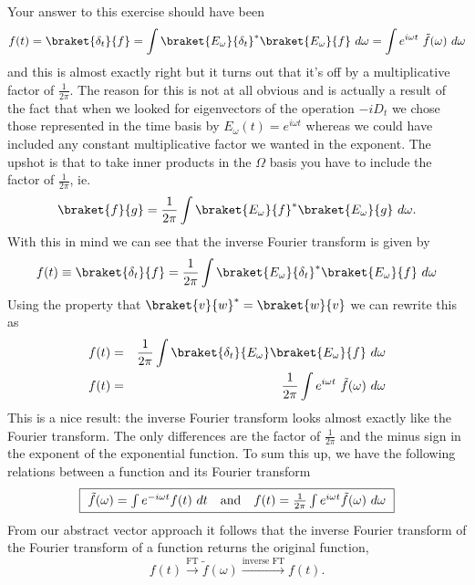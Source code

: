 Your answer to this exercise should have been
\begin{displaymath} f(t) = \braket{\delta_t}{f} = \int \braket{E_\omega}{\delta_t}^*\braket{E_\omega}{f}~d\omega = \int e^{i\omega t}~\tilde{f}(\omega )~d\omega \end{displaymath}
and this is almost exactly right but it turns out that it's off by a multiplicative factor of $\frac{1}{2\pi}$.  The reason for this is not at all obvious and is actually a result of the fact that when we looked for eigenvectors of the operation $-iD_t$ we chose those represented in the time basis by $E_\omega (t) = e^{i\omega t}$ whereas we could have included any constant multiplicative factor we wanted in the exponent.  The upshot is that to take inner products in the $\Omega$ basis you have to include the factor of $\frac{1}{2\pi}$, ie.
\begin{displaymath} \braket{f}{g} = \frac{1}{2\pi}\int \braket{E_\omega}{f}^*\braket{E_\omega}{g}~d\omega. \end{displaymath}
With this in mind we can see that the inverse Fourier transform is given by
\begin{displaymath}
f(t) \equiv \braket{\delta_t}{f} = \frac{1}{2\pi} \int \braket{E_\omega}{\delta_t}^*\braket{E_\omega}{f}~d\omega
\end{displaymath}
Using the property that $\braket{v}{w}^* = \braket{w}{v}$ we can rewrite this as
\begin{eqnarray*}
f(t) &=& \frac{1}{2\pi} \int \braket{\delta_t}{E_\omega}\braket{E_\omega}{f}~d\omega \\
f(t) &=& \frac{1}{2\pi} \int e^{i\omega t}~\tilde{f}(\omega)~d\omega
\end{eqnarray*}
This is a nice result: the inverse Fourier transform looks almost exactly like the Fourier transform.  The only differences are the factor of $\frac{1}{2\pi}$ and the minus sign in the exponent of the exponential function.  To sum this up, we have the following relations between a function and its Fourier transform
\begin{displaymath}
\framebox{
$\tilde{f}(\omega) = \int e^{-i\omega t} f(t)~dt$ ~ and ~
$f(t) = \frac{1}{2\pi} \int e^{i\omega t} \tilde{f}(\omega)~d\omega$
}
\end{displaymath}
From our abstract vector approach it follows that the inverse Fourier transform of the Fourier transform of a function returns the original function,
\begin{displaymath} f(t) \stackrel{\textrm{FT}}{\longrightarrow} \tilde{f}(\omega ) \stackrel{\textrm{inverse FT}}{\longrightarrow} f(t). \end{displaymath}

